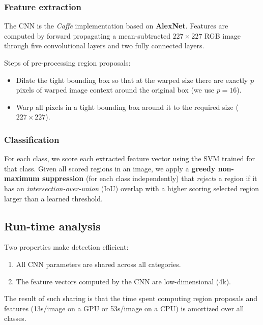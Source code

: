 \documentclass[a4paper,12pt]{article}
\begin{document}
\subsubsection{Feature extraction}

The CNN is the \emph{Caffe} implementation based on \textbf{AlexNet}. Features are computed by forward propagating a mean-subtracted $227 \times 227$ RGB image through five convolutional layers and two fully connected layers.

Steps of pre-processing region proposals:

\begin{itemize}
  \item Dilate the tight bounding box so that at the warped size there are exactly $p$ pixels of warped image context around the original box (we use $p = 16$).
  \item Warp all pixels in a tight bounding box around it to the required size ($227 \times 227$).
\end{itemize}

\subsubsection{Classification}

For each class, we score each extracted feature vector using the SVM trained for that class. Given all scored regions in an image, we apply a \textbf{greedy non-maximum suppression} (for each class independently) that \emph{rejects} a region if it has an \emph{intersection-over-union} (IoU) overlap with a higher scoring selected region larger than a learned threshold.

\subsection{Run-time analysis}

Two properties make detection efficient:

\begin{enumerate}
  \item All CNN parameters are shared across all categories.
  \item The feature vectors computed by the CNN are low-dimensional (4k).
\end{enumerate}

The result of such sharing is that the time spent computing region proposals and features (13s/image on a GPU or 53s/image on a CPU) is amortized over all classes.
\end{document}
